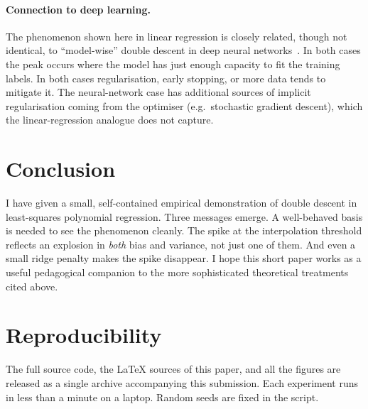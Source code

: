 \documentclass[11pt]{article}
\begin{document}
\paragraph{Connection to deep learning.} The phenomenon shown here
in linear regression is closely related, though not identical, to
``model-wise'' double descent in deep neural
networks~\citep{nakkiran2021deep}. In both cases the peak occurs
where the model has just enough capacity to fit the training labels.
In both cases regularisation, early stopping, or more data tends to
mitigate it. The neural-network case has additional sources of
implicit regularisation coming from the optimiser
(e.g.\ stochastic gradient descent), which the linear-regression
analogue does not capture.

\section{Conclusion}
\label{sec:conclusion}

I have given a small, self-contained empirical demonstration of
double descent in least-squares polynomial regression. Three
messages emerge. A well-behaved basis is needed to see the
phenomenon cleanly. The spike at the interpolation threshold
reflects an explosion in \emph{both} bias and variance, not just one
of them. And even a small ridge penalty makes the spike disappear.
I hope this short paper works as a useful pedagogical companion to
the more sophisticated theoretical treatments cited above.

\section*{Reproducibility}

The full source code, the LaTeX sources of this paper, and all the
figures are released as a single archive accompanying this
submission. Each experiment runs in less than a minute on a laptop.
Random seeds are fixed in the script.



\end{document}
